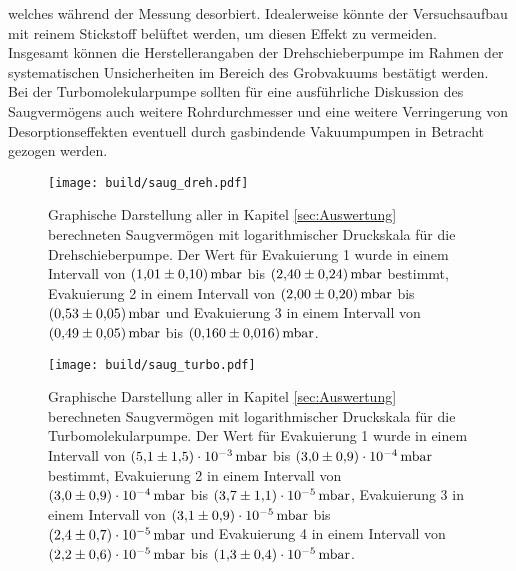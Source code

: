 welches während der Messung desorbiert. Idealerweise könnte der Versuchsaufbau mit reinem Stickstoff 
belüftet werden, um diesen Effekt zu vermeiden.
\\
Insgesamt können die Herstellerangaben der Drehschieberpumpe im Rahmen der systematischen Unsicherheiten 
im Bereich des Grobvakuums bestätigt werden. 
Bei der Turbomolekularpumpe sollten für eine ausführliche Diskussion des 
Saugvermögens auch weitere Rohrdurchmesser und eine weitere Verringerung von Desorptionseffekten 
eventuell durch gasbindende Vakuumpumpen in Betracht gezogen werden.
\begin{figure}[H]
        \centering
        \texttt{[image: build/saug\_dreh.pdf]}
        \caption{Graphische Darstellung aller in Kapitel \ref{sec:Auswertung} berechneten Saugvermögen mit logarithmischer Druckskala für die Drehschieberpumpe. Der Wert für Evakuierung 1 wurde in einem Intervall von ${\SI{1.01 \pm 0.10}{\milli\bar}}$ bis ${\SI{2.40\pm 0.24}{\milli\bar}}$ bestimmt, Evakuierung 2 in einem Intervall von ${\SI{2.00 \pm 0.20}{\milli\bar}}$ bis ${\SI{0.53\pm 0.05}{\milli\bar}}$ und Evakuierung 3 in einem Intervall von ${\SI{0.49 \pm 0.05}{\milli\bar}}$ bis ${\SI{0.160 \pm 0.016}{\milli\bar}}$.}
        \label{fig:saug_dreh}
\end{figure}
\begin{figure}[H]
        \centering
        \texttt{[image: build/saug\_turbo.pdf]}
        \caption{Graphische Darstellung aller in Kapitel \ref{sec:Auswertung} berechneten Saugvermögen mit logarithmischer Druckskala für die Turbomolekularpumpe. Der Wert für Evakuierung 1 wurde in einem Intervall von ${\SI{5.1 \pm 1.5 e-3}{\milli\bar}}$ bis ${\SI{3.0 \pm 0.9 e-4}{\milli\bar}}$ bestimmt, Evakuierung 2 in einem Intervall von ${\SI{3.0 \pm 0.9 e-4}{\milli\bar}}$ bis ${\SI{3.7 \pm 1.1 e-5}{\milli\bar}}$, Evakuierung 3 in einem Intervall von ${\SI{3.1 \pm 0.9 e-5}{\milli\bar}}$ bis ${\SI{2.4 \pm 0.7 e-5}{\milli\bar}}$ und Evakuierung 4 in einem Intervall von ${\SI{2.2 \pm 0.6 e-5}{\milli\bar}}$ bis ${\SI{1.3 \pm 0.4 e-5}{\milli\bar}}$.}
        \label{fig:saug_turbo}
\end{figure}
\noindent